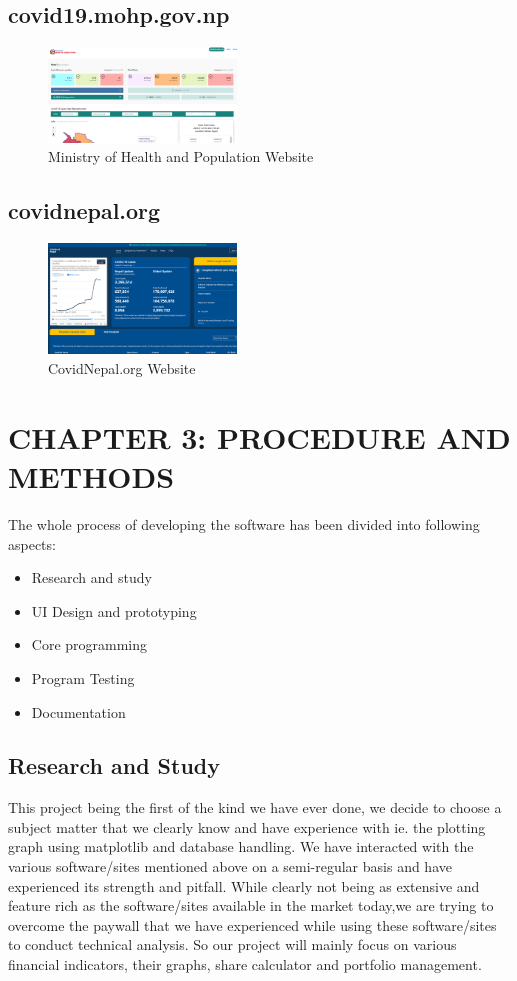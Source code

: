 \documentclass{article}
\begin{document}
\subsection{covid19.mohp.gov.np}
\begin{figure}[h]
    \centerline{\includegraphics[width = 50mm]{mohp.png}}
    \caption{Ministry of Health and Population Website}
    \label{fig}
\end{figure}


\subsection{covidnepal.org}
\begin{figure}[h]
    \centerline{\includegraphics[width = 50mm]{covidnepal.png}}
    \caption{CovidNepal.org Website}
    \label{fig}
\end{figure}


\clearpage

\section{CHAPTER 3: PROCEDURE AND METHODS}
The whole process of developing the software has been divided into following aspects:
\begin{itemize}
    \item Research and study
    \item UI Design and prototyping
    \item Core programming
    \item Program Testing
    \item Documentation
\end{itemize}

\subsection{Research and Study}
This project being the first of the kind we have ever done, we decide to choose a subject matter that we clearly know and have experience with ie. the plotting graph 
using matplotlib and database handling. We have interacted with the various software/sites mentioned above on a semi-regular basis and have experienced its strength 
and pitfall. While clearly not being as extensive and feature rich as the software/sites available in the market today,we are trying to overcome the paywall  that 
we have experienced while using these software/sites to conduct technical analysis. So our project will mainly focus on various financial indicators, their graphs, 
share calculator and portfolio management.
\end{document}
